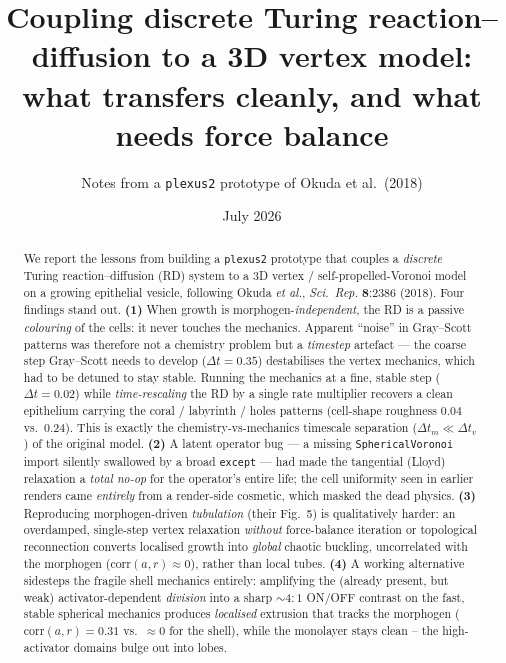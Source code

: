 \documentclass[11pt]{article}
\title{\textbf{Coupling discrete Turing reaction--diffusion to a 3D vertex model:\\
what transfers cleanly, and what needs force balance}}
\author{Notes from a \texttt{plexus2} prototype of Okuda et al.\ (2018)}
\date{July 2026}
\begin{document}
\maketitle

\begin{abstract}
\noindent
We report the lessons from building a \texttt{plexus2} prototype that couples a \emph{discrete}
Turing reaction--diffusion (RD) system to a 3D vertex / self-propelled-Voronoi model on a growing
epithelial vesicle, following Okuda \emph{et al.}, \emph{Sci.\ Rep.} \textbf{8}:2386 (2018). Four
findings stand out. \textbf{(1)} When growth is morphogen-\emph{independent}, the RD is a passive
\emph{colouring} of the cells: it never touches the mechanics. Apparent ``noise'' in Gray--Scott
patterns was therefore not a chemistry problem but a \emph{timestep} artefact --- the coarse step
Gray--Scott needs to develop ($\Delta t\!=\!0.35$) destabilises the vertex mechanics, which had to
be detuned to stay stable. Running the mechanics at a fine, stable step ($\Delta t\!=\!0.02$) while
\emph{time-rescaling} the RD by a single rate multiplier recovers a clean epithelium carrying the
coral / labyrinth / holes patterns (cell-shape roughness $0.04$ vs.\ $0.24$). This is exactly the
chemistry-vs-mechanics timescale separation ($\Delta t_m \ll \Delta t_v$) of the original model.
\textbf{(2)} A latent operator bug --- a missing \texttt{SphericalVoronoi} import silently swallowed
by a broad \texttt{except} --- had made the tangential (Lloyd) relaxation a \emph{total no-op} for
the operator's entire life; the cell uniformity seen in earlier renders came \emph{entirely} from a
render-side cosmetic, which masked the dead physics. \textbf{(3)} Reproducing morphogen-driven
\emph{tubulation} (their Fig.~5) is qualitatively harder: an overdamped, single-step vertex
relaxation \emph{without} force-balance iteration or topological reconnection converts localised
growth into \emph{global} chaotic buckling, uncorrelated with the morphogen
($\mathrm{corr}(a,r)\!\approx\!0$), rather than local tubes. \textbf{(4)} A working alternative
sidesteps the fragile shell mechanics entirely: amplifying the (already present, but weak)
activator-dependent \emph{division} into a sharp $\sim\!4{:}1$ ON/OFF contrast on the fast, stable
spherical mechanics produces \emph{localised} extrusion that tracks the morphogen
($\mathrm{corr}(a,r)\!=\!0.31$ vs.\ $\approx\!0$ for the shell), while the monolayer stays clean --
the high-activator domains bulge out into lobes.
\end{abstract}
\end{document}
